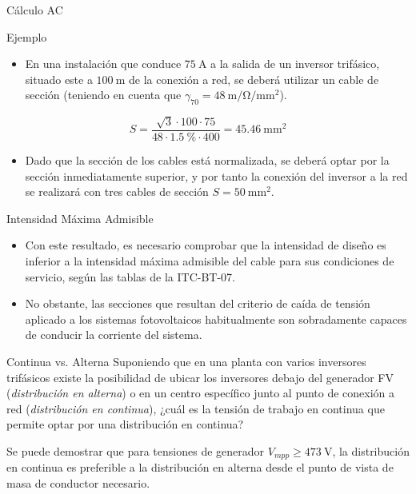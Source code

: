 \documentclass[aspectratio=169, usenames,svgnames,dvipsnames]{beamer}
\begin{document}
\begin{frame}[label={sec:org6a1e122}]{Cálculo AC}
\begin{block}{Ejemplo}
\begin{itemize}
\item En una instalación que conduce \(\SI{75}{\ampere}\) a la salida de un
inversor trifásico, situado este a \(\SI{100}{\meter}\) de la conexión
a red, se deberá utilizar un cable de sección (teniendo en cuenta
que \(\gamma_{70} = \SI{48}{\meter\per\ohm\per\milli\meter\squared}\)).
\end{itemize}


\[
  S=\frac{\sqrt{3} \cdot 100 \cdot 75}{48 \cdot \SI{1.5}{\percent}\cdot400}=\SI{45.46}{\milli\meter\squared}
\]

\begin{itemize}
\item Dado que la sección de los cables está normalizada, se deberá optar
por la sección inmediatamente superior, y por tanto la conexión del
inversor a la red se realizará con tres cables de sección
\(S=\SI{50}{\milli\meter\squared}\).
\end{itemize}
\end{block}
\end{frame}

\begin{frame}[label={sec:org20b85a2}]{Intensidad Máxima Admisible}
\begin{itemize}
\item Con este resultado, es necesario comprobar que la intensidad de diseño es inferior a la intensidad máxima admisible del cable para sus condiciones de servicio, según las tablas de la ITC-BT-07.

\item No obstante, las secciones que resultan del criterio de caída de tensión aplicado a los sistemas fotovoltaicos habitualmente son sobradamente capaces de conducir la corriente del sistema.
\end{itemize}
\end{frame}

\begin{frame}[label={sec:org868168a}]{Continua vs. Alterna}
Suponiendo que en una planta con varios inversores trifásicos existe la
posibilidad de ubicar los inversores debajo del generador FV
(\emph{distribución en alterna}) o en un centro específico junto al punto de
conexión a red (\emph{distribución en continua}), \alert{¿cuál es la tensión de
trabajo en continua que permite optar por una distribución en continua?}

Se puede demostrar que para tensiones de generador \(V_{mpp} \geq
\qty{473}{\volt}\), la distribución en continua es preferible a la
distribución en alterna desde el punto de vista de masa de conductor
necesario.
\end{frame}
\end{document}
